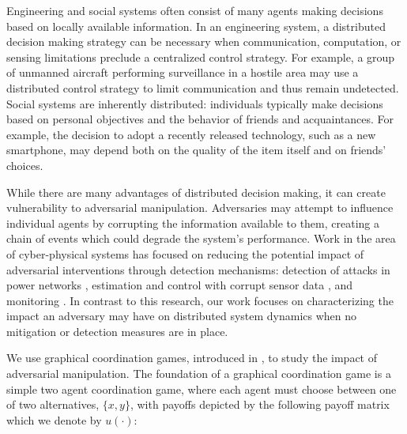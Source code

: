 \label{ch4}



Engineering and social systems often consist of many agents making decisions based on locally available information. In an engineering system, a distributed decision making strategy can be necessary when communication, computation, or sensing limitations preclude a centralized control strategy. For example, a group of unmanned aircraft performing surveillance in a hostile area may use a distributed control strategy to limit communication and thus remain undetected. Social systems are inherently distributed: individuals typically make decisions based on personal objectives and the behavior of friends and acquaintances. For example, the decision to adopt a recently released technology, such as a new smartphone, may depend both on the quality of the item itself and on friends' choices.

While there are many advantages of distributed decision making, it can create vulnerability to adversarial manipulation.  Adversaries may attempt to influence individual agents by corrupting the information available to them, creating a chain of events which could degrade the system's performance. Work in the area of cyber-physical systems has focused on reducing the potential impact of adversarial interventions through detection mechanisms: detection of attacks in power networks \cite{Hendricks2014}, estimation and control with corrupt sensor data \cite{Fawzi2014, Bai2014}, and monitoring \cite{Pasqualetti2012}. In contrast to this research, our work focuses on characterizing the impact an adversary may have on distributed system dynamics when no mitigation or detection measures are in place.

We use graphical coordination games, introduced in \cite{Cooper1999, Ullmann1977}, to study the impact of adversarial manipulation.  The foundation of a graphical coordination game is a simple two agent coordination game, where each agent must choose between one of two alternatives, $\{x,y\}$, with payoffs depicted by the following payoff matrix which we denote by $u(\cdot)$: 

